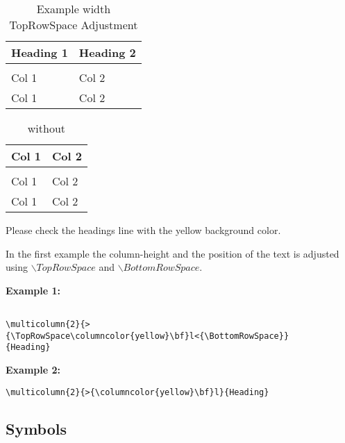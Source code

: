 \documentclass[a4paper,12pt]{article}
\begin{document}
\begin{minipage}[b]{0.5\linewidth}
\small
\begin{longtable}{l l}
\caption{Example width TopRowSpace Adjustment}\\
\toprule
\bf Heading 1 & \bf Heading 2\\
\toprule
\endhead
\bottomrule
\endfoot
\bottomrule
\endlastfoot
\multicolumn{2}{>{\TopRowSpace\columncolor{yellow}\bf}l<{\BottomRowSpace}}{Heading} \\
%
Col 1 & Col 2\\
%
\rowcolor{lightgrey}
Col 1 & Col 2 \\
%
\end{longtable}
\end{minipage}
\begin{minipage}[b]{0.5\linewidth}
\small
\begin{longtable}{l l}
\caption{without}\\
\toprule
\bf Col 1 & \bf Col 2\\
\toprule
\endhead
\bottomrule
\endfoot
\bottomrule
\endlastfoot
\multicolumn{2}{>{\columncolor{yellow}\bf}l}{Heading} \\
%
Col 1 & Col 2\\
%
\rowcolor{lightgrey}
Col 1 & Col 2 \\
%
\end{longtable}
\end{minipage}

Please check the headings line with the yellow background color. 

In the first example the column-height and the position of the text is adjusted using $\backslash TopRowSpace$ and $\backslash BottomRowSpace$.

\textbf{Example 1:}

\begin{verbatim}

\multicolumn{2}{>{\TopRowSpace\columncolor{yellow}\bf}l<{\BottomRowSpace}}
{Heading}
\end{verbatim}

\textbf{Example 2:}

\begin{verbatim}
\multicolumn{2}{>{\columncolor{yellow}\bf}l}{Heading}
\end{verbatim}

\subsection{Symbols}
\end{document}
